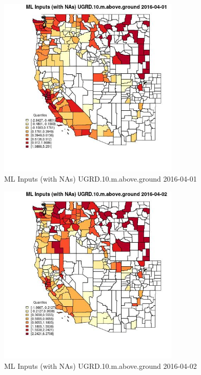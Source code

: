 \begin{figure} 
\centering  
\includegraphics[width=0.77\textwidth]{Code_Outputs/Report_ML_input_PM25_Step4_part_e_de_duplicated_aveswNAs_CountyUGRD10mabovegroundMean2016-04-01_2016-04-01.jpg} 
\caption{\label{fig:Report_ML_input_PM25_Step4_part_e_de_duplicated_aveswNAsCountyUGRD10mabovegroundMean2016-04-01_2016-04-01}ML Inputs (with NAs) UGRD.10.m.above.ground 2016-04-01} 
\end{figure} 
 

\begin{figure} 
\centering  
\includegraphics[width=0.77\textwidth]{Code_Outputs/Report_ML_input_PM25_Step4_part_e_de_duplicated_aveswNAs_CountyUGRD10mabovegroundMean2016-04-02_2016-04-02.jpg} 
\caption{\label{fig:Report_ML_input_PM25_Step4_part_e_de_duplicated_aveswNAsCountyUGRD10mabovegroundMean2016-04-02_2016-04-02}ML Inputs (with NAs) UGRD.10.m.above.ground 2016-04-02} 
\end{figure} 
 

